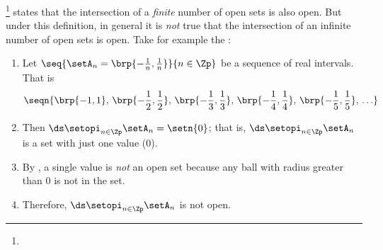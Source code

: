 \begin{counterex}
\footnote{
  }
 states that the intersection of a \emph{finite} number of 
open sets is also open.
But under this definition, in general it is \emph{not} true that the intersection of an infinite number of open sets is open.
Take for example the  :
\begin{enumerate}
  \item Let  $\seq{\setA_n=\brp{-\frac{1}{n},\frac{1}{n}}}{n\in\Zp}$ be a sequence
        of real intervals. That is
        \[\seqn{
          \brp{-1,1},\, \brp{-\frac{1}{2},\frac{1}{2}},\,
                        \brp{-\frac{1}{3},\frac{1}{3}},\,
                        \brp{-\frac{1}{4},\frac{1}{4}},\,
                        \brp{-\frac{1}{5},\frac{1}{5}},\,\ldots
        }\]

  \item Then $\ds\setopi_{n\in\Zp} \setA_n = \setn{0}$; 
        that is, $\ds\setopi_{n\in\Zp} \setA_n$ is a set with just one value ($0$).

  \item By , 
        a single value is \emph{not} an open set because any ball with radius greater than $0$
        is not in the set.

  \item Therefore, $\ds\setopi_{n\in\Zp} \setA_n$ is not open.
\end{enumerate}
\end{counterex}



